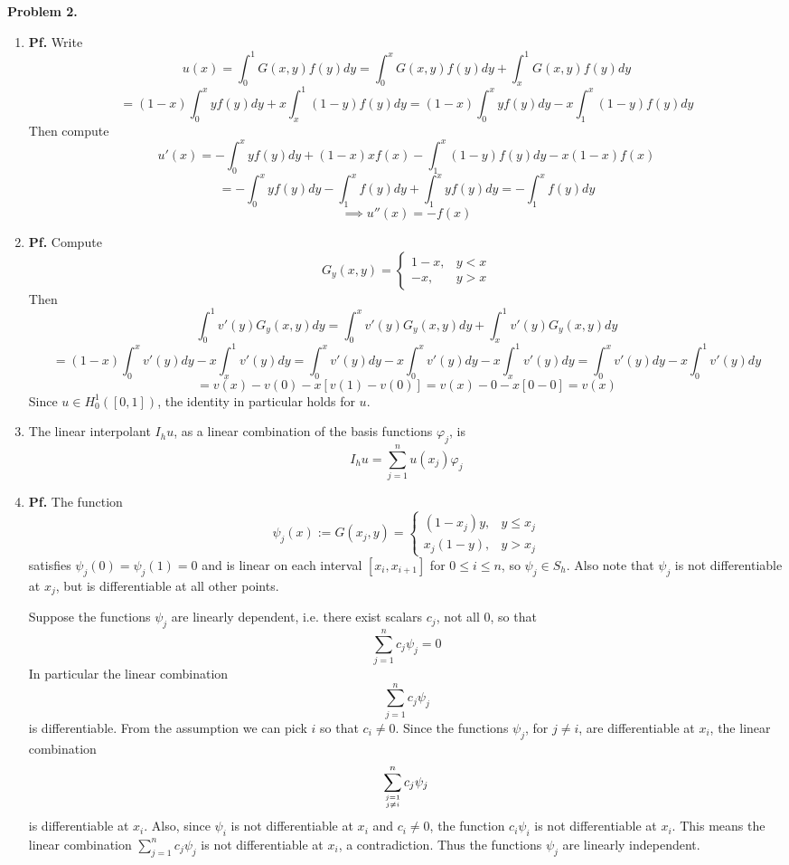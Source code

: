 \documentclass{article}
\def\tbf#1{\textbf{#1}}
\newcommand{\vp}{\varphi}
\newcommand{\pf}{\tbf{Pf. }}
\newcommand{\imp}{\implies}
\begin{document}
\tbf{Problem 2.}

\begin{enumerate}[label=(\alph*)]
	
\item \pf Write
$$u(x) = \int_0^1 G(x,y)f(y)dy
= \int_0^x G(x,y)f(y)dy + \int_x^1 G(x,y)f(y)dy$$
$$= (1-x)\int_0^x yf(y)dy + x\int_x^1 (1-y)f(y)dy
= (1-x)\int_0^x yf(y)dy - x\int_1^x (1-y)f(y)dy$$
Then compute
$$u'(x) = -\int_0^x yf(y)dy + (1-x)xf(x) - \int_1^x (1-y)f(y)dy - x(1-x)f(x)$$
$$= -\int_0^x yf(y)dy - \int_1^x f(y)dy + \int_1^x yf(y)dy
= -\int_1^x f(y)dy$$
$$\imp u''(x) = -f(x)$$


\item \pf Compute
$$G_y(x,y) =
\begin{cases}
	1-x, & y<x\\
	-x, & y>x
\end{cases}$$
Then
$$\int_0^1 v'(y)G_y(x,y)dy = \int_0^x v'(y)G_y(x,y)dy + \int_x^1 v'(y)G_y(x,y)dy$$
$$= (1-x)\int_0^x v'(y)dy - x\int_x^1 v'(y)dy
= \int_0^x v'(y)dy - x\int_0^x v'(y)dy - x\int_x^1 v'(y)dy
= \int_0^x v'(y)dy - x\int_0^1 v'(y)dy$$
$$= v(x) - v(0) - x[v(1) - v(0)]
= v(x) - 0 - x[0 - 0]
= v(x)$$
Since $u\in H^1_0([0,1])$, the identity in particular holds for $u$.


\item The linear interpolant $I_hu$, as a linear combination of the basis functions $\vp_j$, is
$$I_hu = \sum_{j=1}^n u(x_j)\vp_j$$


\item \pf The function
$$\psi_j(x) := G(x_j,y) =
\begin{cases}
	(1-x_j)y, & y\le x_j\\
	x_j(1-y), & y>x_j
\end{cases}$$
satisfies $\psi_j(0)=\psi_j(1)=0$ and is linear on each interval $[x_i,x_{i+1}]$ for $0\le i\le n$, so $\psi_j\in S_h$. Also note that $\psi_j$ is not differentiable at $x_j$, but is differentiable at all other points.

Suppose the functions $\psi_j$ are linearly dependent, i.e. there exist scalars $c_j$, not all 0, so that
$$\sum_{j=1}^nc_j\psi_j=0$$
In particular the linear combination
$$\sum_{j=1}^nc_j\psi_j$$
is differentiable. From the assumption we can pick $i$ so that $c_i\ne0$. Since the functions $\psi_j$, for $j\ne i$, are differentiable at $x_i$, the linear combination
$$\sum_{j=1 \atop j\ne i}^n c_j\psi_j$$
is differentiable at $x_i$. Also, since $\psi_i$ is not differentiable at $x_i$ and $c_i\ne0$, the function $c_i\psi_i$ is not differentiable at $x_i$. This means the linear combination $\sum_{j=1}^nc_j\psi_j$ is not differentiable at $x_i$, a contradiction. Thus the functions $\psi_j$ are linearly independent.


\end{enumerate}
\end{document}
